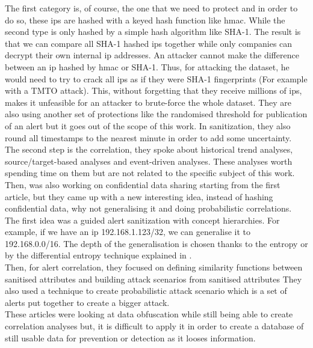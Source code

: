 \documentclass{eplmastersthesis}
\begin{document}
The first category is, of course, the one that we need to protect and in order to do so, these \gls{ip}s are hashed with a keyed hash function like \gls{hmac}. While the second type is only hashed by a simple hash algorithm like SHA-1.
The result is that we can compare all SHA-1 hashed \gls{ip}s together while only companies can decrypt their own internal \gls{ip} addresses.
An attacker cannot make the difference between an \gls{ip} hashed by \gls{hmac}  or SHA-1. Thus, for attacking the dataset, he would need to try to crack all \gls{ip}s as if they were SHA-1 fingerprints (For example with a TMTO attack). This, without forgetting that they receive millions of \gls{ip}s, makes it unfeasible for an attacker to brute-force the whole dataset.
They are also using another set of protections like the randomised threshold for publication of an alert but it goes out of the scope of this work.
In sanitization, they also round all timestamps to the nearest minute in order to add some uncertainty.
The second step is the correlation, they spoke about historical trend analyses, source/target-based analyses and event-driven analyses. These analyses worth spending time on them but are not related to the specific subject of this work.\\

Then, \cite{xu2005privacy} was also working on confidential data sharing starting from the first article, but they came up with a new interesting idea, instead of hashing confidential data, why not generalising it and doing probabilistic correlations.
The first idea was a guided alert sanitization with concept hierarchies. For example, if we have an \gls{ip} 192.168.1.123/32, we can generalise it to 192.168.0.0/16.
The depth of the generalisation is chosen thanks to the entropy or by the differential entropy technique explained in \cite{cover1991elements}.
\\
Then, for alert correlation, they focused on defining similarity functions between sanitised attributes and building attack scenarios from sanitised attributes
They also used a technique to create probabilistic attack scenario which is a set of alerts put together to create a bigger attack.\\

These articles were looking at data obfuscation while still being able to create correlation analyses but, it is difficult to apply it in order to create a database of still usable data for prevention or detection as it looses information.
\\
\end{document}
